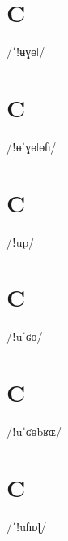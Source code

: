 \documentclass[10pt,a4paper,twoside]{book}
\begin{document}
\section*{C}

\begin{multicols}{3}
 {/ˈǃʉɣɵǀ/} {}
\end{multicols}

\section*{C}

\begin{multicols}{3}
 {/ǃʉˈɣɵǀɵɦ/} {}
\end{multicols}

\section*{C}

\begin{multicols}{3}
 {/ǃup/} {}
\end{multicols}

\section*{C}

\begin{multicols}{3}
 {/ǃuˈʛɵ/} {}
\end{multicols}

\section*{C}

\begin{multicols}{3}
 {/ǃuˈʛɵbʁɶ/} {}
\end{multicols}

\section*{C}

\begin{multicols}{3}
 {/ˈǃuɦɒɭ/} {}
\end{multicols}
\end{document}
